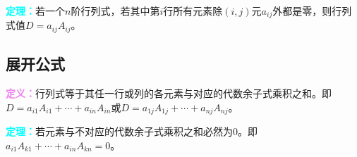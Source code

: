 \documentclass[UTF8, 12pt]{ctexart}
\begin{document}
\textcolor{aqua}{\textbf{定理：}}若一个$n$阶行列式，若其中第$i$行所有元素除$(i,j)$元$a_{ij}$外都是零，则行列式值$D=a_{ij}A_{ij}$。

\subsection{展开公式}

\textcolor{violet}{\textbf{定义：}}行列式等于其任一行或列的各元素与对应的代数余子式乘积之和。即$D=a_{i1}A_{i1}+\cdots+a_{in}A_{in}$或$D=a_{1j}A_{1j}+\cdots+a_{nj}A_{nj}$。

\textcolor{aqua}{\textbf{定理：}}若元素与不对应的代数余子式乘积之和必然为0。即$a_{i1}A_{k1}+\cdots+a_{in}A_{kn}=0$。
\end{document}
